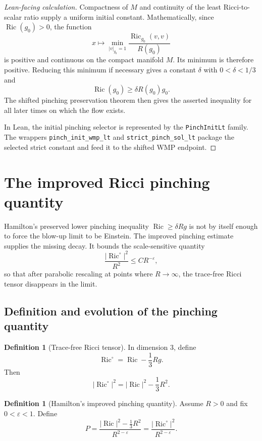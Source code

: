\documentclass[11pt]{article}
\theoremstyle{plain}
\theoremstyle{definition}
\newtheorem{definition}[theorem]{Definition}
\theoremstyle{remark}
\newcommand{\Ric}{\operatorname{Ric}}
\newcommand{\norm}[1]{\left|#1\right|}
\newcommand{\eps}{\varepsilon}
\newcommand{\leanref}[1]{\nolinkurl{#1}}
\begin{document}
\begin{proof}[Lean-facing calculation]
Compactness of \(M\) and continuity of the least Ricci-to-scalar ratio supply a
uniform initial constant.  Mathematically, since \(\Ric(g_0)>0\), the function
\[
x\mapsto \min_{\norm{v}_{g_0}=1}\frac{\Ric_{g_0}(v,v)}{R(g_0)}
\]
is positive and continuous on the compact manifold \(M\).  Its minimum is
therefore positive.  Reducing this minimum if necessary gives a constant
\(\delta\) with \(0<\delta<1/3\) and
\[
\Ric(g_0)\ge \delta R(g_0)g_0.
\]
The shifted pinching preservation theorem then gives the asserted inequality
for all later times on which the flow exists.

In Lean, the initial pinching selector is represented by the
\leanref{PinchInitLt} family.  The wrappers \leanref{pinch_init_wmp_lt} and
\leanref{strict_pinch_sol_lt} package the selected strict constant and feed it
to the shifted WMP endpoint.
\end{proof}

\section{The improved Ricci pinching quantity}

Hamilton's preserved lower pinching inequality \(\Ric \ge \delta Rg\) is not
by itself enough to force the blow-up limit to be Einstein.  The improved
pinching estimate supplies the missing decay.  It bounds the scale-sensitive
quantity
\[
  \frac{\norm{\Ric^\circ}^2}{R^2}
  \le C R^{-\varepsilon},
\]
so that after parabolic rescaling at points where \(R\to\infty\), the
trace-free Ricci tensor disappears in the limit.

\subsection{Definition and evolution of the pinching quantity}

\begin{definition}[Trace-free Ricci tensor]
\label{def:tracefree-ricci}
In dimension $3$, define
\[
\Ric^\circ
=
\Ric-\frac13Rg.
\]
Then
\[
\norm{\Ric^\circ}^2
=
\norm{\Ric}^2-\frac13R^2.
\]
\end{definition}

\begin{definition}[Hamilton's improved pinching quantity]
\label{def:pinching-P}
Assume $R>0$ and fix $0<\eps<1$. Define
\[
P
=
\frac{\norm{\Ric}^2-\frac13R^2}{R^{2-\eps}}
=
\frac{\norm{\Ric^\circ}^2}{R^{2-\eps}}.
\]
\end{definition}
\end{document}

